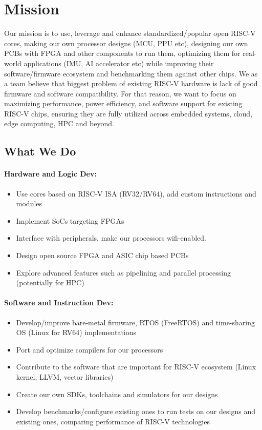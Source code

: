 \documentclass{article}
\begin{document}
\section{Mission}
Our mission is to use, leverage and enhance standardized/popular open RISC-V cores, making our own processor designs (MCU, PPU etc), designing our own PCBs with FPGA and other components to run them, optimizing them for real-world applications (IMU, AI accelerator etc) while improving their software/firmware ecosystem and benchmarking them against other chips. We as a team believe that biggest problem of existing RISC-V hardware is lack of good firmware and software compatibility. For that reason, we want to focus on maximizing performance, power efficiency, and software support for existing RISC-V chips, ensuring they are fully utilized across embedded systems, cloud, edge computing, HPC and beyond.


\subsection{What We Do}

\paragraph{Hardware and Logic Dev:}

\begin{itemize}
    \item Use cores based on RISC-V ISA (RV32/RV64), add custom instructions and modules
    \item Implement SoCs targeting FPGAs
    \item Interface with peripherals, make our processors wifi-enabled.
    \item Design open source FPGA and ASIC chip based PCBs 
    \item Explore advanced features such as pipelining and parallel processing (potentially for HPC)
\end{itemize}
\paragraph{Software and Instruction Dev:}

\begin{itemize}
    \item Develop/improve bare-metal firmware, RTOS (FreeRTOS) and time-sharing OS (Linux for RV64) implementations
    \item Port and optimize compilers for our processors
    \item Contribute to the software that are important for RISC-V ecosystem (Linux kernel, LLVM, vector libraries)
    \item Create our own SDKs, toolchains and simulators for our designs
    \item Develop benchmarks/configure existing ones to run tests on our designs and existing ones, comparing performance of RISC-V technologies
\end{itemize}
\end{document}
